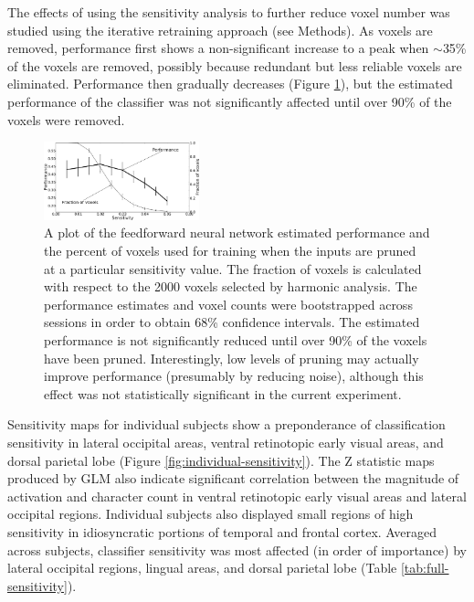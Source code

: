 \documentclass[5p,authoryear]{elsarticle}
\begin{document}
The effects of using the sensitivity analysis to further reduce voxel number was studied using the iterative retraining approach (see Methods).
As voxels are removed, performance first shows a non-significant increase to a peak when $\sim$35\% of the voxels are removed, possibly because redundant but less reliable voxels are  eliminated. Performance then gradually decreases (Figure \ref{fig:sensitivity-cutoff}), but the estimated performance of the classifier was not significantly affected until over 90\% of the voxels were removed.

\begin{figure}
\centering
\includegraphics[width=0.4\textwidth]{figures/performance-verse-sensitivity-cutoff}
\caption{A plot of the feedforward neural network estimated performance and the percent of voxels used for training when the inputs are pruned at a particular sensitivity value.
The fraction of voxels is calculated with respect to the 2000 voxels selected by harmonic analysis.
The performance estimates and voxel counts were bootstrapped across sessions in order to obtain 68\% confidence intervals.
The estimated performance is not significantly reduced until over 90\% of the voxels have been pruned.
Interestingly, low levels of pruning may actually improve performance (presumably by reducing noise), although this effect was not statistically significant in the current experiment.} 
\label{fig:sensitivity-cutoff}
\end{figure}

Sensitivity maps for individual subjects show a preponderance of classification sensitivity in lateral occipital areas, ventral retinotopic early visual areas, and dorsal parietal lobe (Figure \ref{fig:individual-sensitivity}). 
The Z statistic maps produced by GLM also indicate significant correlation between the magnitude of activation and character count in ventral retinotopic early visual areas and lateral occipital regions.
Individual subjects also displayed small regions of high sensitivity in idiosyncratic portions of temporal and frontal cortex. 
Averaged across subjects, classifier sensitivity was most affected (in order of importance) by lateral occipital regions, lingual areas, and dorsal parietal lobe (Table \ref{tab:full-sensitivity}). 
\end{document}

